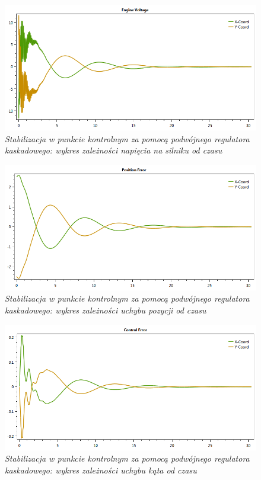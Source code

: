 \documentclass[12pt, oneside]{report}
\theoremstyle{definition}
\begin{document}
\begin{figure}[H]
	\centering
		\includegraphics[width = 350pt]{LineCasPIDEV} 
		\caption{\textit{Stabilizacja w punkcie kontrolnym za pomocą podwójnego regulatora kaskadowego: wykres zależności napięcia na silniku od czasu}}
		\label{plot:LineCasPIDEV}
\end{figure}

\begin{figure}[H]
	\centering
		\includegraphics[width = 350pt]{LineCasPIDCEP} 
		\caption{\textit{Stabilizacja w punkcie kontrolnym za pomocą podwójnego regulatora kaskadowego: wykres zależności uchybu pozycji od czasu}}
		\label{plot:LineCasPIDCEP}
\end{figure}

\begin{figure}[H]
	\centering
		\includegraphics[width = 350pt]{LineCasPIDCEA} 
		\caption{\textit{Stabilizacja w punkcie kontrolnym za pomocą podwójnego regulatora kaskadowego: wykres zależności uchybu kąta od czasu}}
		\label{plot:LineCasPIDCEA}
\end{figure}
\end{document}
